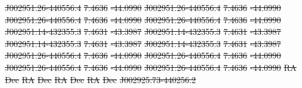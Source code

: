 \documentclass[11pt, a4paper]{book}
\providecommand{\DIFdeltex}[1]{{\protect\color{red}\sout{#1}}}                      %
\providecommand{\DIFdel}[1]{\texorpdfstring{\DIFdeltex{#1}}{}} %
\begin{document}
\DIFdel{J002951.26-440556.4 }%
\DIFdel{7.4636 }%
\DIFdel{-44.0990 }%
\DIFdel{J002951.26-440556.4 }%
\DIFdel{7.4636 }%
\DIFdel{-44.0990 }%
\DIFdel{J002951.26-440556.4 }%
\DIFdel{7.4636 }%
\DIFdel{-44.0990 }%
\DIFdel{J002951.26-440556.4 }%
\DIFdel{7.4636 }%
\DIFdel{-44.0990}%
\DIFdel{J002951.14-432355.3 }%
\DIFdel{7.4631 }%
\DIFdel{-43.3987 }%
\DIFdel{J002951.14-432355.3 }%
\DIFdel{7.4631 }%
\DIFdel{-43.3987 }%
\DIFdel{J002951.14-432355.3 }%
\DIFdel{7.4631 }%
\DIFdel{-43.3987 }%
\DIFdel{J002951.14-432355.3 }%
\DIFdel{7.4631 }%
\DIFdel{-43.3987}%
\DIFdel{J002951.26-440556.4 }%
\DIFdel{7.4636 }%
\DIFdel{-44.0990 }%
\DIFdel{J002951.26-440556.4 }%
\DIFdel{7.4636 }%
\DIFdel{-44.0990 }%
\DIFdel{J002951.26-440556.4 }%
\DIFdel{7.4636 }%
\DIFdel{-44.0990 }%
\DIFdel{J002951.26-440556.4 }%
\DIFdel{7.4636 }%
\DIFdel{-44.0990}%
\DIFdel{RA }%
\DIFdel{Dec }%
\DIFdel{RA }%
\DIFdel{Dec }%
\DIFdel{RA }%
\DIFdel{Dec }%
\DIFdel{RA }%
\DIFdel{Dec }%
\DIFdel{J002925.73-440256.2 }%
\end{document}
